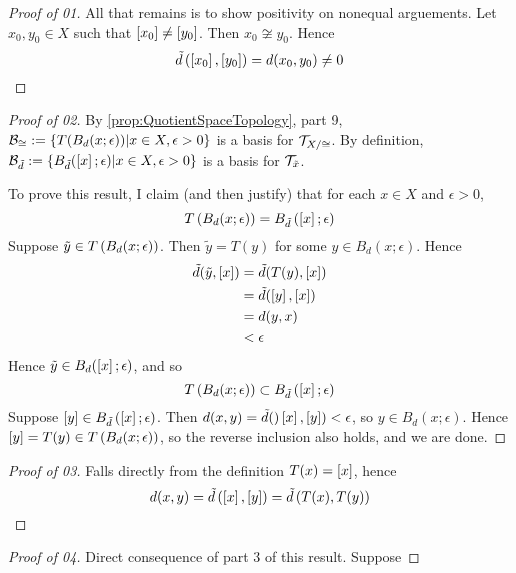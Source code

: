 \begin{prop}
\begin{proof}[Proof of 01]
         All that remains is to show positivity on nonequal arguements. Let $x_0, y_0 \in X$ such that $\left[ x_0 \right] \neq \left[ y_0 \right]$. Then $x_0 \not \cong y_0$. Hence \begin{equation*}
             \tilde{d}\left( \left[ x_0 \right], \left[ y_0 \right]\right)=d(x_0,y_0) \neq 0
             \end{equation*}
    \end{proof}
    \begin{proof}[Proof of 02]
        By \ref{prop:QuotientSpaceTopology}, part 9, $\mathcal{B}_{\cong}:=\{T(B_d(x;\epsilon)) | x \in X, \epsilon > 0\}$ is a basis for $\mathcal{T}_{X/\cong}$. 
        By definition, $\mathcal{B}_{\tilde{d}}:=\{B_{\tilde{d}}(\left[ x \right]; \epsilon) | x \in X , \epsilon > 0 \}$ is a basis for $\mathcal{T}_{\tilde{x}}$. 
        
        To prove this result, I claim (and then justify) that for each $x \in X$ and $\epsilon > 0$, 
        \begin{equation}
            T\left( B_d(x;\epsilon)\right) = B_{\tilde{d}} \left( \left[ x \right]; \epsilon\right)
        \end{equation}
        Suppose $\tilde{y} \in T\left( B_d(x;\epsilon)\right)$. Then $\tilde{y}=T(y)$ for some $y \in B_d(x;\epsilon)$. Hence 
        \begin{align*}
            \tilde{d}(\tilde{y},\left[ x \right])& =\tilde{d}(T(y),\left[ x \right])\\
            &=\tilde{d}(\left[ y \right],\left[ x \right])\\
            & = d(y,x) \\
            & < \epsilon
        \end{align*}
        Hence $\tilde{y} \in B_d(\left[ x \right] ; \epsilon)$, and so 
                \begin{equation}
            T\left( B_d(x;\epsilon)\right) \subset  B_{\tilde{d}} \left( \left[ x \right]; \epsilon\right)
        \end{equation}
        Suppose $\left[ y \right] \in B_{\tilde{d}}\left( \left[ x \right] ; \epsilon\right)$. 
        Then $d(x,y) = \tilde{d}()\left[ x \right],\left[ y \right]) < \epsilon$, so $y \in B_d(x; \epsilon)$. 
        Hence $[y]=T(y) \in T\left( B_d(x;\epsilon)\right)$, so the reverse inclusion also holds, and we are done. 
    \end{proof}
    \begin{proof}[Proof of 03]
        Falls directly from the definition $T(x)=\left[ x \right]$, hence
        \begin{equation}
            d(x,y) = \tilde{d}\left( \left[ x \right], \left[ y \right]\right) = \tilde{d}\left( T(x), T(y)\right)
        \end{equation}
    \end{proof}
    \begin{proof}[Proof of 04]
        Direct consequence of part 3 of this result. 
        Suppose 
    \end{proof}
\end{prop}